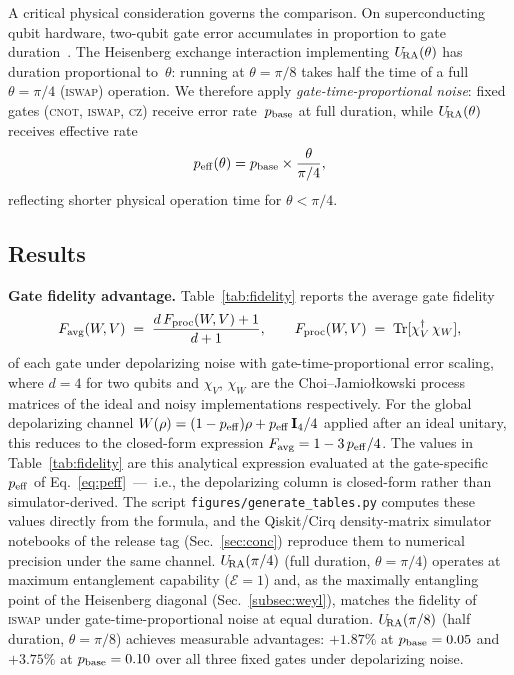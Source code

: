 A critical physical consideration governs the comparison.
On superconducting qubit hardware, two-qubit gate error accumulates in
proportion to gate duration~\cite{Krantz2019}.
The Heisenberg exchange interaction implementing $U_{\!\mathrm{RA}}(\theta)$ has
duration proportional to~$\theta$: running at $\theta = \pi/8$ takes
half the time of a full $\theta = \pi/4$ (\textsc{iswap}) operation.
We therefore apply \emph{gate-time-proportional noise}: fixed gates
(\textsc{cnot}, \textsc{iswap}, \textsc{cz}) receive error rate~$p_{\rm base}$
at full duration, while $U_{\!\mathrm{RA}}(\theta)$ receives effective rate
\begin{equation}
  p_{\rm eff}(\theta) = p_{\rm base} \times \frac{\theta}{\pi/4},
  \label{eq:peff}
\end{equation}
reflecting shorter physical operation time for $\theta < \pi/4$.

\subsection{Results}

\textbf{Gate fidelity advantage.}
Table~\ref{tab:fidelity} reports the average gate
fidelity~\cite{Nielsen2002Fidelity}
\begin{equation}
  F_{\rm avg}(W, V) \;=\; \frac{d\,F_{\rm proc}(W, V) + 1}{d + 1},
  \qquad
  F_{\rm proc}(W, V) \;=\; \mathrm{Tr}[\chi_V^\dagger\,\chi_W],
  \label{eq:favg}
\end{equation}
of each gate under depolarizing noise with gate-time-proportional
error scaling, where $d = 4$ for two qubits and $\chi_V$, $\chi_W$ are
the Choi--Jamio\l{}kowski process matrices of the ideal and noisy
implementations respectively.
For the global depolarizing channel $W(\rho) = (1-p_{\rm eff})\rho +
p_{\rm eff}\,\mathbf{I}_4/4$ applied after an ideal unitary, this
reduces to the closed-form expression
$F_{\rm avg} = 1 - 3\,p_{\rm eff}/4$.
The values in Table~\ref{tab:fidelity} are this analytical expression
evaluated at the gate-specific $p_{\rm eff}$ of
Eq.~\eqref{eq:peff}~---~i.e., the depolarizing column is closed-form
rather than simulator-derived.
The script \texttt{figures/generate\_tables.py} computes these values
directly from the formula, and the Qiskit/Cirq density-matrix
simulator notebooks of the release tag (Sec.~\ref{sec:conc}) reproduce
them to numerical precision under the same channel.
$U_{\!\mathrm{RA}}(\pi/4)$ (full duration, $\theta = \pi/4$) operates at maximum
entanglement capability ($\mathcal{E} = 1$) and, as the maximally entangling
point of the Heisenberg diagonal (Sec.~\ref{subsec:weyl}), matches the
fidelity of \textsc{iswap} under gate-time-proportional noise at equal duration.
$U_{\!\mathrm{RA}}(\pi/8)$ (half duration, $\theta = \pi/8$) achieves measurable
advantages: $+1.87\%$ at $p_{\rm base} = 0.05$ and $+3.75\%$ at
$p_{\rm base} = 0.10$ over all three fixed gates under depolarizing noise.


